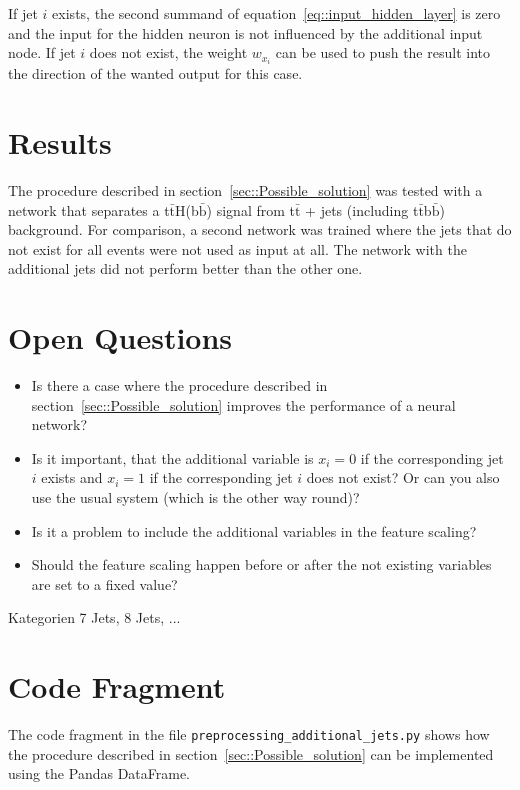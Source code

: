 \documentclass[12pt,a4paper]{article}
\begin{document}
If jet $i$ exists, the second summand of equation~\eqref{eq::input_hidden_layer} is zero and the input for the hidden neuron is not influenced by the additional input node. If jet $i$ does not exist, the weight $w_{x_i}$ can be used to push the result into the direction of the wanted output for this case.


\section{Results}

The procedure described in section~\ref{sec::Possible_solution} was tested with a network that separates a t$\bar{\text{t}}$H(b$\bar{\text{b}}$) signal from t$\bar{\text{t}}$ + jets (including t$\bar{\text{t}}$b$\bar{\text{b}}$) background. For comparison, a second network was trained where the jets that do not exist for all events were not used as input at all. The network with the additional jets did not perform better than the other one.


\section{Open Questions}

\begin{itemize}
\item Is there a case where the procedure described in section~\ref{sec::Possible_solution} improves the performance of a neural network?
\item Is it important, that the additional variable is $x_i = 0$ if the corresponding jet $i$ exists and $x_i = 1$ if the corresponding jet $i$ does not exist? Or can you also use the usual system (which is the other way round)?
\item Is it a problem to include the additional variables in the feature scaling?
\item Should the feature scaling happen before or after the not existing variables are set to a fixed value?
\end{itemize}
\undetaruindeatnuidareniutdrn Kategorien 7 Jets, 8 Jets, ...

\section{Code Fragment}

The code fragment in the file \texttt{preprocessing\_additional\_jets.py} shows how the procedure described in section~\ref{sec::Possible_solution} can be implemented using the Pandas DataFrame.
\end{document}
